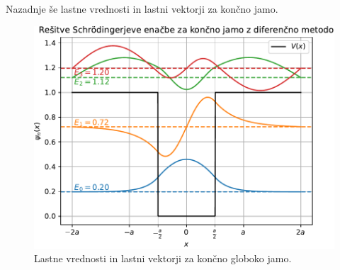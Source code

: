 \newpage
Nazadnje še lastne vrednosti in lastni vektorji za končno jamo.
\begin{figure}
    \centering
    \includegraphics[width=\textwidth]{pdfs/jama.pdf}
    \caption{Lastne vrednosti in lastni vektorji za končno globoko jamo.}
\end{figure}